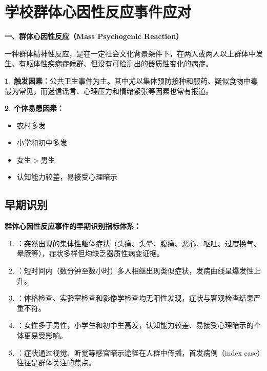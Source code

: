 \section{学校群体心因性反应事件应对}

\begin{keybox}
\textbf{一、群体心因性反应（Mass Psychogenic Reaction）}

一种群体精神性反应，是在一定社会文化背景条件下，在两人或两人以上群体中发生、有躯体性疾病症候群、但没有可检测出的器质性变化的病症。

\textbf{1. 触发因素：}公共卫生事件为主。其中尤以集体预防接种和服药、疑似食物中毒最为常见，而迷信谣言、心理压力和情绪紧张等因素也常有报道。

\textbf{2. 个体易患因素：}
\begin{itemize}[leftmargin=*]
    \item 农村多发
    \item 小学和初中多发
    \item 女生$>$男生
    \item 认知能力较差，易接受心理暗示
\end{itemize}

\subsection{早期识别}

\begin{keybox}
\textbf{群体心因性反应事件的早期识别指标体系：}

\begin{enumerate}[leftmargin=*]
    \item {}：突然出现的集体性躯体症状（头痛、头晕、腹痛、恶心、呕吐、过度换气、晕厥等），症状多样但均缺乏器质性病变证据。

    \item {}：短时间内（数分钟至数小时）多人相继出现类似症状，发病曲线呈爆发性上升。

    \item {}：体格检查、实验室检查和影像学检查均无阳性发现，症状与客观检查结果严重不符。

    \item {}：女性多于男性，小学生和初中生高发，认知能力较差、易接受心理暗示的个体更易受影响。

    \item {}：症状通过视觉、听觉等感官暗示途径在人群中传播，首发病例（index case）往往是群体关注的焦点。


\end{enumerate}
\end{keybox}
\end{keybox}
